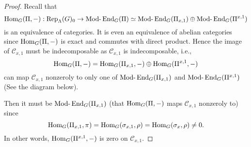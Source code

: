 	\begin{proof}
		Recall that 
		$$\Hom_G(\Pi, -): \Rep_{\Lambda}(G)_0 \to \Modr\End_G(\Pi) \simeq \Modr\End_G(\Pi_{x,1}) \oplus \Modr\End_G(\Pi^{x,1})$$ 
		is an equivalence of categories. It is even an equivalence of abelian categories since $\Hom_G(\Pi, -)$ is exact and commutes with direct product. Hence the image of $\mathcal{C}_{x,1}$ must be indecomposable as $\mathcal{C}_{x,1}$ is indecomposable, i.e., 
		$$\Hom_G(\Pi, -)=\Hom_G(\Pi_{x,1}, -) \oplus \Hom_G(\Pi^{x,1}, -)$$
		can map $\mathcal{C}_{x,1}$ nonzeroly to only one of $\Modr\End_G(\Pi_{x,1})$ and $\Modr\End_G(\Pi^{x,1})$ (See the diagram below). 
		
		
		Then it must be $\Modr\End_G(\Pi_{x,1})$ (that $\Hom_G(\Pi, -)$ maps $\mathcal{C}_{x,1}$ nonzeroly to) since 
		$$\Hom_G(\Pi_{x,1}, \pi)=\Hom_G(\sigma_{x,1}, \rho)=\Hom_G(\sigma_x, \rho) \neq 0.$$
		In other words, $\Hom_G(\Pi^{x,1}, -)$ is zero on $\mathcal{C}_{x,1}$.
		
	\end{proof}

